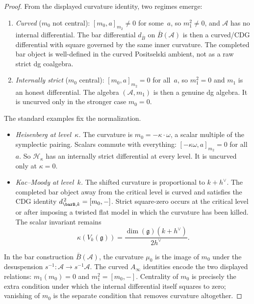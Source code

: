 \begin{proof}
From the displayed curvature identity, two regimes emerge:

\begin{enumerate}[label=(\roman*)]
\item \emph{Curved} ($m_0$ not central): $[m_0, a]_{m_2} \neq 0$ for
some~$a$, so $m_1^2 \neq 0$, and $\mathcal{A}$ has no internal
differential. The bar differential $d_{\bar{B}}$ on $\bar{B}(\mathcal{A})$
is then a curved/CDG differential with square governed by the same
inner curvature. The completed bar object is well-defined in the
curved Positselski ambient, not as a raw strict dg coalgebra.

\item \emph{Internally strict} ($m_0$ central): $[m_0, a]_{m_2} = 0$
for all~$a$, so $m_1^2 = 0$ and $m_1$ is an honest differential.
The algebra $(\mathcal{A}, m_1)$ is then a genuine dg algebra. It is
uncurved only in the stronger case $m_0=0$.
\end{enumerate}

The standard examples fix the normalization.
\begin{itemize}
\item \emph{Heisenberg at level~$\kappa$.} The curvature is
$m_0 = -\kappa \cdot \omega$, a scalar multiple of the symplectic
pairing. Scalars commute with everything:
$[-\kappa \omega, a]_{m_2} = 0$ for all~$a$. So $\mathcal{H}_\kappa$
has an internally strict differential at every level. It is uncurved
only at $\kappa=0$.

\item \emph{Kac--Moody at level~$k$.} The shifted curvature is
proportional to $k+h^\vee$. The completed bar object away from the
critical level is curved and satisfies the CDG identity
$d_{\barB,k}^{\,2}=[m_0,-]$. Strict square-zero occurs at the critical
level or after imposing a twisted flat model in which the curvature
has been killed. The scalar invariant remains
\[
\kappa(V_k(\mathfrak{g}))
=\frac{\dim(\mathfrak{g})(k+h^\vee)}{2h^\vee}.
\]
\end{itemize}

In the bar construction $\bar{B}(\mathcal{A})$, the curvature $\mu_0$
is the image of $m_0$ under the desuspension
$s^{-1}\colon\mathcal{A}\to s^{-1}\mathcal{A}$. The curved
$A_\infty$ identities encode the two displayed relations:
$m_1(m_0)=0$ and $m_1^2=[m_0,-]$. Centrality of $m_0$ is precisely the
extra condition under which the internal differential itself squares
to zero; vanishing of $m_0$ is the separate condition that removes
curvature altogether.
\end{proof}

